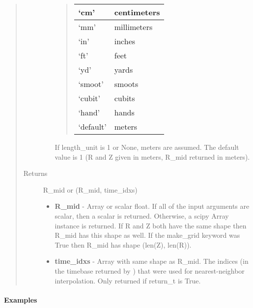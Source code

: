 \documentclass[letterpaper,10pt,english]{sphinxmanual}
\begin{document}
\begin{fulllineitems}
\begin{fulllineitems}
\begin{quote}
\begin{description}
\begin{itemize}
\begin{quote}
\begin{tabulary}{\linewidth}{|L|L|}
`cm'
 & 
centimeters
\\\hline

`mm'
 & 
millimeters
\\\hline

`in'
 & 
inches
\\\hline

`ft'
 & 
feet
\\\hline

`yd'
 & 
yards
\\\hline

`smoot'
 & 
smoots
\\\hline

`cubit'
 & 
cubits
\\\hline

`hand'
 & 
hands
\\\hline

`default'
 & 
meters
\\\hline
\end{tabulary}

\end{quote}

If length\_unit is 1 or None, meters are assumed. The default
value is 1 (R and Z given in meters, R\_mid returned in meters).

\end{itemize}

\item[{Returns}] \leavevmode

R\_mid or (R\_mid, time\_idxs)
\begin{itemize}
\item {} 
\textbf{R\_mid} - Array or scalar float. If all of the input arguments are
scalar, then a scalar is returned. Otherwise, a scipy Array
instance is returned. If R and Z both have the same shape then
R\_mid has this shape as well. If the make\_grid keyword was True
then R\_mid has shape (len(Z), len(R)).

\item {} 
\textbf{time\_idxs} - Array with same shape as R\_mid. The indices (in
the timebase returned by {\hyperref[eqtools:eqtools.core.Equilibrium.getTimeBase]{}}) that were used
for nearest-neighbor interpolation. Only returned if return\_t is
True.

\end{itemize}


\end{description}\end{quote}
\paragraph{Examples}


\end{fulllineitems}
\end{fulllineitems}
\end{document}
